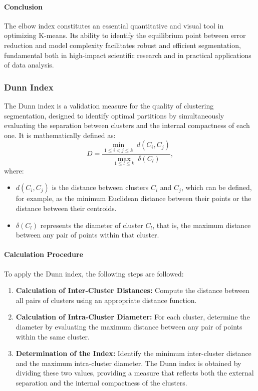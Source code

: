 \documentclass[10pt]{article}
\begin{document}
\paragraph{Conclusion}  
The elbow index constitutes an essential quantitative and visual tool in optimizing K-means. Its ability to identify the equilibrium point between error reduction and model complexity facilitates robust and efficient segmentation, fundamental both in high-impact scientific research and in practical applications of data analysis.

\subsubsection{Dunn Index}
The Dunn index is a validation measure for the quality of clustering segmentation, designed to identify optimal partitions by simultaneously evaluating the separation between clusters and the internal compactness of each one. It is mathematically defined as:
\[
D = \frac{\min_{1 \leq i < j \leq k} \; d(C_i, C_j)}{\max_{1 \leq l \leq k} \; \delta(C_l)},
\]
where:
\begin{itemize}
    \item $d(C_i, C_j)$ is the distance between clusters $C_i$ and $C_j$, which can be defined, for example, as the minimum Euclidean distance between their points or the distance between their centroids.
    \item $\delta(C_l)$ represents the diameter of cluster $C_l$, that is, the maximum distance between any pair of points within that cluster.
\end{itemize}

\paragraph{Calculation Procedure}  
To apply the Dunn index, the following steps are followed:
\begin{enumerate}
    \item \textbf{Calculation of Inter-Cluster Distances:} Compute the distance between all pairs of clusters using an appropriate distance function.
    \item \textbf{Calculation of Intra-Cluster Diameter:} For each cluster, determine the diameter by evaluating the maximum distance between any pair of points within the same cluster.
    \item \textbf{Determination of the Index:} Identify the minimum inter-cluster distance and the maximum intra-cluster diameter. The Dunn index is obtained by dividing these two values, providing a measure that reflects both the external separation and the internal compactness of the clusters.
\end{enumerate}
\end{document}
